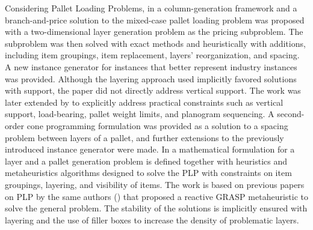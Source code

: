 Considering Pallet Loading Problems, in \cite{elhedhli2019three} a column-generation framework and a branch-and-price solution to the mixed-case pallet loading problem was proposed with a two-dimensional layer generation problem as the pricing subproblem.
The subproblem was then solved with exact methods and heuristically with additions, including item groupings, item replacement, layers' reorganization, and spacing.
A new instance generator for instances that better represent industry instances was provided. Although the layering approach used implicitly favored solutions with support, the paper did not directly address vertical support.
The work was later extended by \cite{GZARA20201062} to explicitly address practical constraints such as vertical support, load-bearing, pallet weight limits, and planogram sequencing.
A second-order cone programming formulation was provided as a solution to a spacing problem between layers of a pallet, and further extensions to the previously introduced instance generator were made.
In \cite{Calzavara2021} a mathematical formulation for a layer and a pallet generation problem is defined together with heuristics and metaheuristics algorithms designed to solve the PLP with constraints on item groupings, layering, and visibility of items.
The work is based on previous papers on PLP by the same authors (\cite{Iori2020a, Iori2020b, Iori2021}) that proposed a reactive GRASP metaheuristic to solve the general problem.
The stability of the solutions is implicitly ensured with layering and the use of filler boxes to increase the density of problematic layers.